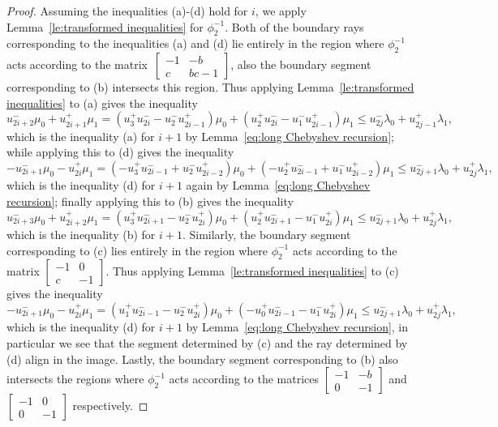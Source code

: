 \documentclass{amsart}
\numberwithin{theorem}{section}
\begin{document}
\begin{proof}
    Assuming the inequalities (a)-(d) hold for $i$, we apply Lemma~\ref{le:transformed inequalities} for $\phi_2^{-1}$.
    Both of the boundary rays corresponding to the inequalities (a) and (d) lie entirely in the region where $\phi_2^{-1}$ acts according to the matrix~$\left[ \begin{array}{cc} -1 & -b\\ c & bc-1 \end{array}\right]$, also the boundary segment corresponding to (b) intersects this region.
    Thus applying Lemma~\ref{le:transformed inequalities} to (a) gives the inequality 
    \[u_{2i+2}^-\mu_0+u_{2i+1}^+\mu_1=(u_3^+u_{2i}^--u_2^-u_{2i-1}^+)\mu_0+(u_2^+u_{2i}^--u_1^-u_{2i-1}^+)\mu_1\le u_{2j}^-\lambda_0+u_{2j-1}^+\lambda_1,\]
    which is the inequality (a) for $i+1$ by Lemma~\ref{eq:long Chebyshev recursion}; while applying this to (d) gives the inequality 
    \[-u_{2i+1}^-\mu_0-u_{2i}^+\mu_1=(-u_3^+u_{2i-1}^-+u_2^-u_{2i-2}^+)\mu_0+(-u_2^+u_{2i-1}^-+u_1^-u_{2i-2}^+)\mu_1\le u_{2j+1}^-\lambda_0+u_{2j}^+\lambda_1,\]
    which is the inequality (d) for $i+1$ again by Lemma~\ref{eq:long Chebyshev recursion}; finally applying this to (b) gives the inequality 
    \[u_{2i+3}^-\mu_0+u_{2i+2}^+\mu_1=(u_3^+u_{2i+1}^--u_2^-u_{2i}^+)\mu_0+(u_2^+u_{2i+1}^--u_1^-u_{2i}^+)\mu_1\le u_{2j+1}^-\lambda_0+u_{2j}^+\lambda_1,\]
    which is the inequality (b) for $i+1$.
    Similarly, the boundary segment corresponding to (c) lies entirely in the region where $\phi_2^{-1}$ acts according to the matrix $\left[ \begin{array}{cc} -1 & 0\\ c & -1 \end{array}\right]$.
    Thus applying Lemma~\ref{le:transformed inequalities} to (c) gives the inequality 
    \[-u_{2i+1}^-\mu_0-u_{2i}^+\mu_1=(u_1^+u_{2i-1}^--u_2^-u_{2i}^+)\mu_0+(-u_0^+u_{2i-1}^--u_1^-u_{2i}^+)\mu_1\le u_{2j+1}^-\lambda_0+u_{2j}^+\lambda_1,\]
    which is the inequality (d) for $i+1$ by Lemma~\ref{eq:long Chebyshev recursion}, in particular we see that the segment determined by (c) and the ray determined by (d) align in the image.
    Lastly, the boundary segment corresponding to (b) also intersects the regions where $\phi_2^{-1}$ acts according to the matrices $\left[ \begin{array}{cc} -1 & -b\\ 0 & -1 \end{array}\right]$ and $\left[ \begin{array}{cc} -1 & 0\\ 0 & -1 \end{array}\right]$ respectively.

\end{proof}
\end{document}
